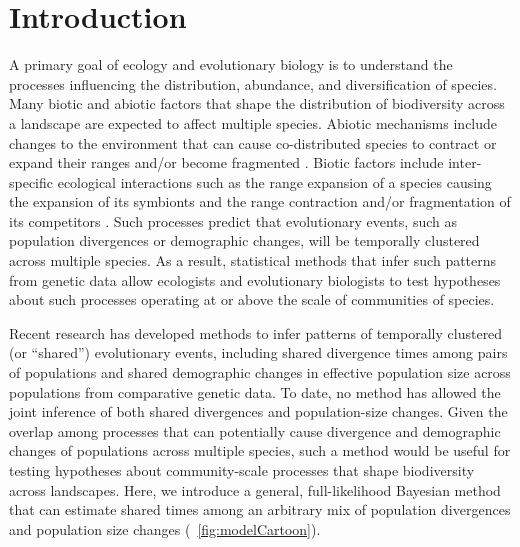 \section{Introduction}

A primary goal of ecology and evolutionary biology is to understand the
processes influencing the distribution, abundance, and diversification of
species.
Many biotic and abiotic factors that shape the distribution of biodiversity
across a landscape are expected to affect multiple species.
Abiotic mechanisms include changes to the environment that can cause
co-distributed species to contract or expand their ranges and/or become
fragmented \citep{Wegener1966,Avise1987,Knowles2002}.
Biotic factors include inter-specific ecological interactions such as the range
expansion of a species causing the expansion of its symbionts and the range
contraction and/or fragmentation of its competitors
\citep{Lotka1920,Volterra1926}.
Such processes predict that evolutionary events, such as population divergences
or demographic changes, will be temporally clustered across multiple species.
As a result, statistical methods that infer such patterns from genetic data
allow ecologists and evolutionary biologists to test hypotheses about such
processes operating at or above the scale of communities of species.

Recent research has developed methods to infer
patterns of temporally clustered (or ``shared'') evolutionary events,
including shared divergence times among pairs of populations
\citep{Hickerson2006,Hickerson2007,Huang2011,Oaks2014dpp,Oaks2018ecoevolity}
and shared demographic changes in effective population size across populations
\citep{Chan2014,Xue2015,Burbrink2016,Prates2016,Xue2017,Gehara2017}
from comparative genetic data.
To date, no method has allowed the joint inference of both shared divergences
and population-size changes.
Given the overlap among processes that can potentially cause divergence and
demographic changes of populations across multiple species, such a method would
be useful for testing hypotheses about community-scale processes that shape
biodiversity across landscapes.
Here, we introduce a general, full-likelihood Bayesian method that can estimate
shared times among an arbitrary mix of population divergences and population
size changes (\fig{}~\ref{fig:modelCartoon}).

